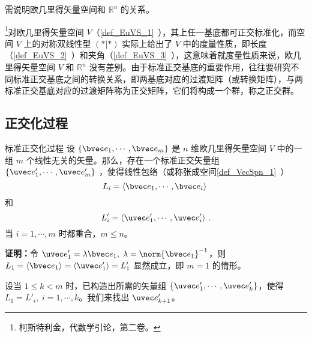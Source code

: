 
\begin{issues}
\issueTODO 需说明欧几里得矢量空间和 $\mathbb{R}^n$ 的关系。
\end{issues}

\footnote{柯斯特利金，代数学引论，第二卷。}对欧几里得矢量空间 $V$（\autoref{def_EuVS_1}~），其上任一基底都可正交标准化，而空间 $V$ 上的对称双线性型 $(*|*)$ 实际上给出了 $V$ 中的度量性质，即长度（\autoref{def_EuVS_2}~）和夹角（\autoref{def_EuVS_3}~），这意味着就度量性质来说，欧几里得矢量空间 $V$ 和 $\mathbb{R}^n$ 没有差别。由于标准正交基底的重要作用，往往要研究不同标准正交基底之间的转换关系，即两基底对应的过渡矩阵（或转换矩阵），与两标准正交基底对应的过渡矩阵称为正交矩阵，它们将构成一个群，称之正交群。
\subsection{正交化过程}
\begin{theorem}{标准正交化过程}\label{the_EVOIOG_1}
设 $\{\bvec e_1,\cdots,\bvec e_m\}$ 是 $n$ 维欧几里得矢量空间 $V$ 中的一组 $m$ 个线性无关的矢量。那么，存在一个标准正交矢量组 $\{\uvec e'_1,\cdots,\uvec e'_m\}$ ，使得线性包络（或称张成空间\autoref{def_VecSpn_1}~）
\begin{equation}
L_i=\langle\bvec e_1,\cdots,\bvec e_i\rangle~
\end{equation}
和
\begin{equation}
L'_i=\langle\uvec e'_1,\cdots,\uvec e'_i\rangle~.
\end{equation}
当 $i=1,\cdots,m$ 时都重合，$m\leq n$。
\end{theorem}
\textbf{证明：}令 $\uvec e'_1=\lambda\bvec e_1,\;\lambda=\norm{\bvec e_1}^{-1}$，则 $L_1=\langle\bvec e_1\rangle=\langle \uvec e'_1\rangle=L'_1$ 显然成立，即 $m=1$ 的情形。

设当 $1\leq k<m$ 时，已构造出所需的矢量组 $\{\uvec e'_1,\cdots,\uvec e'_k\}$，使得 $L_1=L'_i,\;i=1,\cdots,k$。我们来找出 $\uvec e'_{k+1}$。

